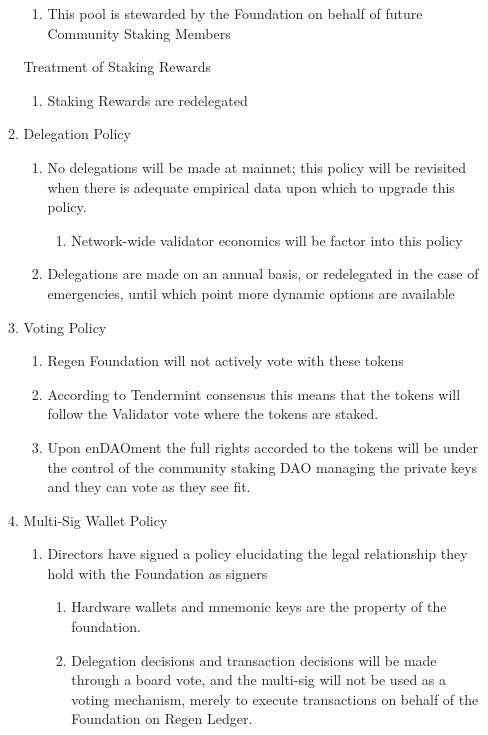 \documentclass{article}
\begin{document}
\begin{enumerate}
\begin{enumerate}
\begin{enumerate}
\item This pool is stewarded by the Foundation on behalf of future Community Staking Members
\end{enumerate}
Treatment of Staking Rewards
\begin{enumerate}
\item Staking Rewards are redelegated
\end{enumerate}
\item Delegation Policy
\begin{enumerate}
\item No delegations will be made at mainnet; this policy will be revisited when there is adequate empirical data upon which to upgrade this policy.
\begin{enumerate}
\item Network-wide validator economics will be factor into this policy
\end{enumerate}
\item Delegations are made on an annual basis, or redelegated in the case of emergencies, until which point more dynamic options are available
\end{enumerate}
\item Voting Policy
\begin{enumerate}
\item Regen Foundation will not actively vote with these tokens
\item According to Tendermint consensus this means that the tokens will follow the Validator vote where the tokens are staked.  
\item Upon enDAOment the full rights accorded to the tokens will be under the control of the community staking DAO managing the private keys and they can vote as they see fit.
\end{enumerate}
\item Multi-Sig Wallet Policy
\begin{enumerate}
\item Directors have signed a policy elucidating the legal relationship they hold with the Foundation as signers
\begin{enumerate}
\item Hardware wallets and mnemonic keys are the property of the foundation.
\item Delegation decisions and transaction decisions will be made through a board vote, and the multi-sig will not be used as a voting mechanism, merely to execute transactions on behalf of the Foundation on Regen Ledger.

\end{enumerate}
\end{enumerate}
\end{enumerate}
\end{enumerate}
\end{document}
